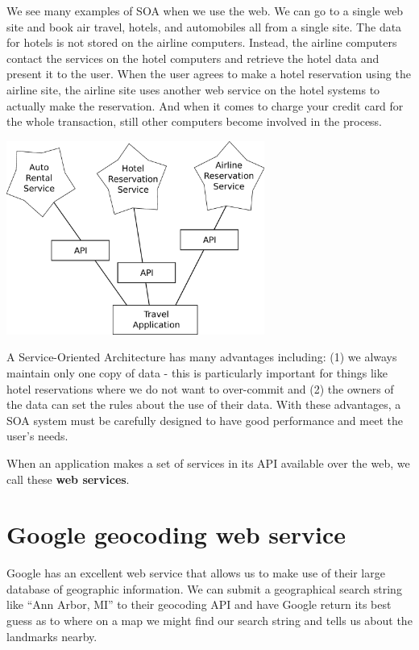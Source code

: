 \documentclass[11pt]{book}
\begin{document}
We see many examples of SOA when we use the web.  We can go to a single 
web site and book air travel, hotels, and automobiles all from a 
single site.  The data for hotels is not stored on the airline computers. 
Instead, the airline computers contact the services on the hotel computers
and retrieve the hotel data and present it to the user.  When the user
agrees to make a hotel reservation using the airline site, the airline site uses
another web service on the hotel systems to actually make the reservation.
And when it comes to charge your credit card for the whole transaction, 
still other computers become involved in the process.

\beforefig
\centerline{\includegraphics[height=2.50in]{figs2/soa.eps}}
\afterfig

A Service-Oriented Architecture has many advantages including: (1) we 
always maintain only one copy of data - this is particularly important
for things like hotel reservations where we do not want to over-commit
and (2) the owners of the data can set the rules about the use of their 
data.   With these advantages, a SOA system must be carefully designed
to have good performance and meet the user's needs.

When an application makes a set of services in its API available over the web, 
we call these {\bf web services}. 

\section{Google geocoding web service}

Google has an excellent web service that allows us to make use of their 
large database of geographic information.   We can submit a geographical
search string like ``Ann Arbor, MI'' to their geocoding API and have Google 
return its best guess as to where on a map we might find our search string and
tells us about the landmarks nearby.
\end{document}
